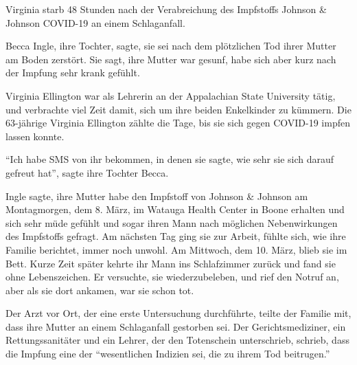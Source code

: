 Virginia starb 48 Stunden nach der Verabreichung des Impfstoffs Johnson \&
Johnson COVID-19 an einem Schlaganfall.

Becca Ingle, ihre Tochter, sagte, sie sei nach dem plötzlichen Tod ihrer Mutter
am Boden zerstört. Sie sagt, ihre Mutter war gesunf, habe sich aber kurz nach
der Impfung sehr krank gefühlt.

Virginia Ellington war als Lehrerin an der Appalachian State University tätig,
und verbrachte viel Zeit damit, sich um ihre beiden Enkelkinder zu kümmern. Die
63-jährige Virginia Ellington zählte die Tage, bis sie sich gegen COVID-19
impfen lassen konnte.

“Ich habe SMS von ihr bekommen, in denen sie sagte, wie sehr sie sich darauf
gefreut hat”, sagte ihre Tochter Becca.

Ingle sagte, ihre Mutter habe den Impfstoff von Johnson \& Johnson am
Montagmorgen, dem 8. März, im Watauga Health Center in Boone erhalten und sich
sehr müde gefühlt und sogar ihren Mann nach möglichen Nebenwirkungen des
Impfstoffs gefragt. Am nächsten Tag ging sie zur Arbeit, fühlte sich, wie ihre
Familie berichtet, immer noch unwohl. Am Mittwoch, dem 10. März, blieb sie im
Bett. Kurze Zeit später kehrte ihr Mann ins Schlafzimmer zurück und fand sie
ohne Lebenszeichen. Er versuchte, sie wiederzubeleben, und rief den Notruf an,
aber als sie dort ankamen, war sie schon tot.

Der Arzt vor Ort, der eine erste Untersuchung durchführte, teilte der Familie
mit, dass ihre Mutter an einem Schlaganfall gestorben sei. Der
Gerichtsmediziner, ein Rettungssanitäter und ein Lehrer, der den Totenschein
unterschrieb, schrieb, dass die Impfung eine der “wesentlichen Indizien sei, die
zu ihrem Tod beitrugen.”
